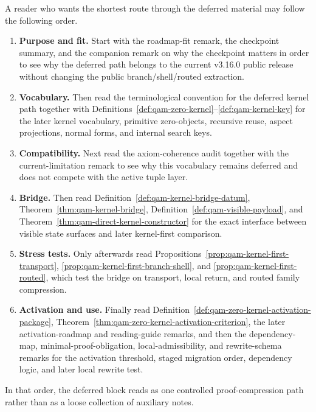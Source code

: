 \begin{remark}\label{rem:qam-zero-kernel-navigation}
A reader who wants the shortest route through the deferred material may follow the following order.
\begin{enumerate}[leftmargin=2em]
  \item \textbf{Purpose and fit.} Start with the roadmap-fit remark, the checkpoint summary, and the companion remark on why the checkpoint matters in order to see why the deferred path belongs to the current v3.16.0 public release without changing the public branch/shell/routed extraction.
  \item \textbf{Vocabulary.} Then read the terminological convention for the deferred kernel path together with Definitions~\ref{def:qam-zero-kernel}--\ref{def:qam-kernel-key} for the later kernel vocabulary, primitive zero-objects, recursive reuse, aspect projections, normal forms, and internal search keys.
  \item \textbf{Compatibility.} Next read the axiom-coherence audit together with the current-limitation remark to see why this vocabulary remains deferred and does not compete with the active tuple layer.
  \item \textbf{Bridge.} Then read Definition~\ref{def:qam-kernel-bridge-datum}, Theorem~\ref{thm:qam-kernel-bridge}, Definition~\ref{def:qam-visible-payload}, and Theorem~\ref{thm:qam-direct-kernel-constructor} for the exact interface between visible state surfaces and later kernel-first comparison.
  \item \textbf{Stress tests.} Only afterwards read Propositions~\ref{prop:qam-kernel-first-transport}, \ref{prop:qam-kernel-first-branch-shell}, and \ref{prop:qam-kernel-first-routed}, which test the bridge on transport, local return, and routed family compression.
  \item \textbf{Activation and use.} Finally read Definition~\ref{def:qam-zero-kernel-activation-package}, Theorem~\ref{thm:qam-zero-kernel-activation-criterion}, the later activation-roadmap and reading-guide remarks, and then the dependency-map, minimal-proof-obligation, local-admissibility, and rewrite-schema remarks for the activation threshold, staged migration order, dependency logic, and later local rewrite test.
\end{enumerate}
In that order, the deferred block reads as one controlled proof-compression path rather than as a loose collection of auxiliary notes.
\end{remark}

